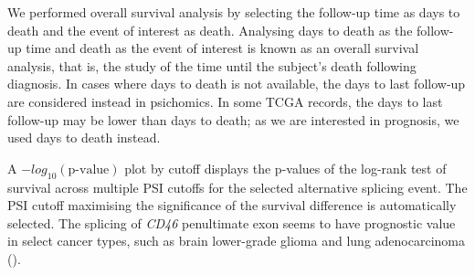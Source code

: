 
We performed overall survival analysis by selecting the follow-up time as days to death and the event of interest as death. Analysing days to death as the follow-up time and death as the event of interest is known as an overall survival analysis, that is, the study of the time until the subject’s death following diagnosis. In cases where days to death is not available, the days to last follow-up are considered instead in psichomics. In some TCGA records, the days to last follow-up may be lower than days to death; as we are interested in prognosis, we used days to death instead.
 
A $-log_{10}(\textrm{p-value})$ plot by cutoff displays the p-values of the log-rank test of survival across multiple PSI cutoffs for the selected alternative splicing event. The PSI cutoff maximising the significance of the survival difference is automatically selected. The splicing of \emph{CD46} penultimate exon seems to have prognostic value in select cancer types, such as brain lower-grade glioma and lung adenocarcinoma ().


